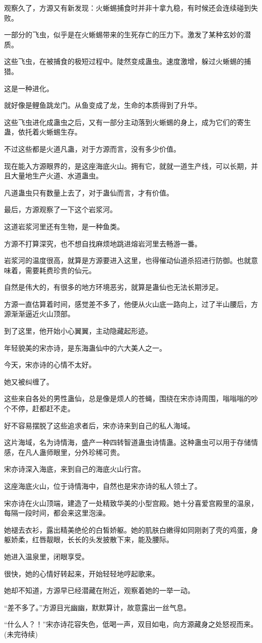\begin{this_body}
观察久了，方源又有新发现：火蜥蜴捕食时并非十拿九稳，有时候还会连续碰到失败。

一部分的飞虫，似乎是在火蜥蜴带来的生死存亡的压力下。激发了某种玄妙的潜质。

这些飞虫，在被捕食的极短过程中。陡然变成蛊虫。速度激增，躲过火蜥蜴的捕猎。

这是一种进化。

就好像是鲤鱼跳龙门。从鱼变成了龙，生命的本质得到了升华。

这些飞虫进化成蛊虫之后，又有一部分主动落到火蜥蜴的身上，成为它们的寄生蛊，依托着火蜥蜴生存。

不过这些都是火道凡蛊，对于方源而言，没有多少价值。

现在能入方源眼界的，是这座海底火山。拥有它，就就一道生产线，可以长期，并且大量地生产火道、水道蛊虫。

凡道蛊虫只有数量上去了，对于蛊仙而言，才有价值。

最后，方源观察了一下这个岩浆河。

这道岩浆河里还有生物，是一种鱼类。

方源不打算深究，也不想自找麻烦地跳进熔岩河里去畅游一番。

岩浆河的温度很高，就算是方源要进入这里，也得催动仙道杀招进行防御。也就意味着，需要耗费珍贵的仙元。

自然是伟大的，有很多的地方环境恶劣，就算是蛊仙也无法长期涉足。

方源一直估算着时间，感觉差不多了，他便从火山底一路向上，过了半山腰后，方源渐渐逼近火山顶部。

到了这里，他开始小心翼翼，主动隐藏起形迹。

年轻貌美的宋亦诗，是东海蛊仙中的六大美人之一。

今天，宋亦诗的心情不太好。

她又被纠缠了。

这些来自各处的男性蛊仙，总是像是烦人的苍蝇，围绕在宋亦诗周围，嗡嗡嗡的吵个不停，赶都赶不走。

好不容易摆脱了这些追求者后，宋亦诗来到自己的私人海域。

这片海域，名为诗情海，盛产一种四转智道蛊虫诗情蛊。这种蛊虫可以用于存储情感，在凡人蛊师眼里，分外珍稀可贵。

宋亦诗深入海底，来到自己的海底火山行宫。

这座海底火山，位于诗情海中，自然也是宋亦诗的私人领土了。

宋亦诗在火山顶端，建造了一处精致华美的小型宫殿。她十分喜爱宫殿里的温泉，每隔一段时间，都会来这里泡澡。

她褪去衣衫，露出精美绝伦的白皙娇躯。她的肌肤白嫩得如同刚剥了壳的鸡蛋，身躯娇柔，红唇靓眼，长长的头发披散下来，能及腰际。

她进入温泉里，闭眼享受。

很快，她的心情好转起来，开始轻轻地哼起歌来。

她却不知道，方源早已经潜藏在附近，观察着她的一举一动。

“差不多了。”方源目光幽幽，默默算计，故意露出一丝气息。

“什么人？！”宋亦诗花容失色，低喝一声，双目如电，向方源藏身之处怒视而来。(未完待续)

\end{this_body}

